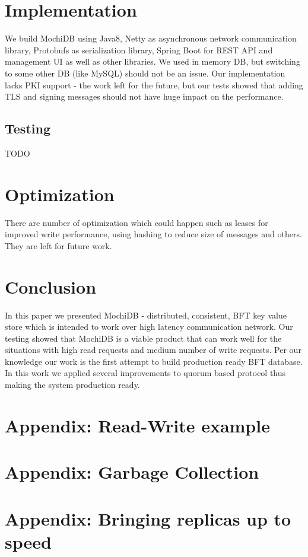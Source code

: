 \documentclass[letterpaper,twocolumn,10pt]{article}
\begin{document}
\section{Implementation}
We build MochiDB using Java8, Netty as asynchronous network communication library, Protobufs as serialization library, Spring Boot for REST API and management UI as well as other libraries. We used in memory DB, but switching to some other DB (like MySQL) should not be an issue. Our implementation lacks PKI support - the work left for the future, but our tests showed that adding TLS and signing messages should not have huge impact on the performance.  

\subsection{Testing}
TODO

\section{Optimization}
There are number of optimization which could happen such as leases for improved write performance, using hashing to reduce size of messages and others. They are left for future work.

\section{Conclusion}
In this paper we presented MochiDB - distributed, consistent, BFT key value store which is intended to work over high latency communication network. Our testing showed that MochiDB is a viable product that can work well for the situations with high read requests and medium number of write requests. Per our knowledge our work is the first attempt to build production ready BFT database. In this work we applied several improvements to quorum based protocol thus making the system production ready.

{\footnotesize 
}

\clearpage
\appendix
\section{Appendix: Read-Write example}

\section{Appendix: Garbage Collection}

\section{Appendix: Bringing replicas up to speed}

\theendnotes
\end{document}
